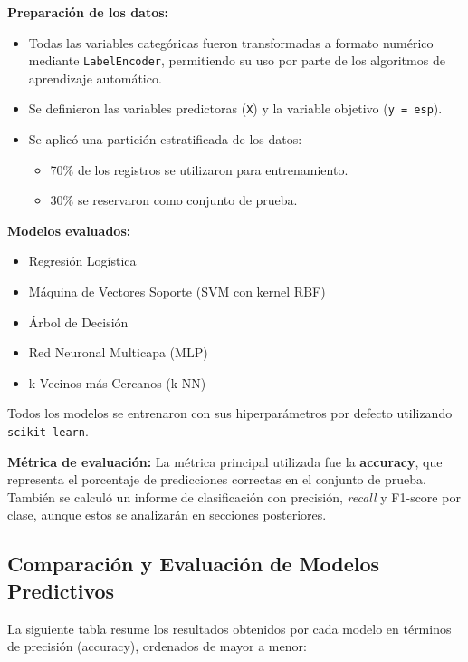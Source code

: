 \documentclass[11pt,a4paper]{article}
\begin{document}
\noindent\textbf{Preparación de los datos:}
\begin{itemize}
    \item Todas las variables categóricas fueron transformadas a formato numérico mediante \texttt{LabelEncoder}, permitiendo su uso por parte de los algoritmos de aprendizaje automático.
    \item Se definieron las variables predictoras (\texttt{X}) y la variable objetivo (\texttt{y = esp}).
    \item Se aplicó una partición estratificada de los datos:
    \begin{itemize}
        \item 70\% de los registros se utilizaron para entrenamiento.
        \item 30\% se reservaron como conjunto de prueba.
    \end{itemize}
\end{itemize}

\medskip

\noindent\textbf{Modelos evaluados:}
\begin{itemize}
    \item Regresión Logística
    \item Máquina de Vectores Soporte (SVM con kernel RBF)
    \item Árbol de Decisión
    \item Red Neuronal Multicapa (MLP)
    \item k-Vecinos más Cercanos (k-NN)
\end{itemize}

Todos los modelos se entrenaron con sus hiperparámetros por defecto utilizando \texttt{scikit-learn}.

\medskip

\noindent\textbf{Métrica de evaluación:}  
La métrica principal utilizada fue la \textbf{accuracy}, que representa el porcentaje de predicciones correctas en el conjunto de prueba. También se calculó un informe de clasificación con precisión, \textit{recall} y F1-score por clase, aunque estos se analizarán en secciones posteriores.

\subsection{Comparación y Evaluación de Modelos Predictivos}

La siguiente tabla resume los resultados obtenidos por cada modelo en términos de precisión (accuracy), ordenados de mayor a menor:
\end{document}
